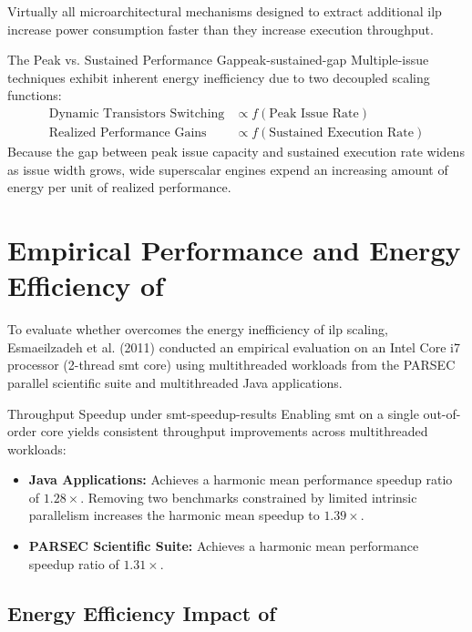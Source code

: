 Virtually all microarchitectural mechanisms designed to extract additional \gls{ilp} increase power consumption faster than they increase execution throughput.

\begin{definition}{The Peak vs. Sustained Performance Gap}{peak-sustained-gap}
Multiple-issue techniques exhibit inherent energy inefficiency due to two decoupled scaling functions:
\begin{align}
\text{Dynamic Transistors Switching} &\propto f(\text{Peak Issue Rate}) \\
\text{Realized Performance Gains} &\propto f(\text{Sustained Execution Rate})
\end{align}
Because the gap between peak issue capacity and sustained execution rate widens as issue width grows, wide superscalar engines expend an increasing amount of energy per unit of realized performance.
\end{definition}

\section{Empirical Performance and Energy Efficiency of }
\label{sec:empirical_smt_performance_energy}

To evaluate whether  overcomes the energy inefficiency of \gls{ilp} scaling, Esmaeilzadeh et al. (2011) conducted an empirical evaluation on an Intel Core i7 processor (2-thread \gls{smt} core) using multithreaded workloads from the \textsf{PARSEC} parallel scientific suite and multithreaded Java applications.

\begin{observation}{Throughput Speedup under }{smt-speedup-results}
Enabling \gls{smt} on a single out-of-order core yields consistent throughput improvements across multithreaded workloads:
\begin{itemize}
    \item \textbf{Java Applications:} Achieves a harmonic mean performance speedup ratio of $1.28\times$. Removing two benchmarks constrained by limited intrinsic parallelism increases the harmonic mean speedup to $1.39\times$.
    \item \textbf{PARSEC Scientific Suite:} Achieves a harmonic mean performance speedup ratio of $1.31\times$.
\end{itemize}
\end{observation}

\subsection{Energy Efficiency Impact of }

